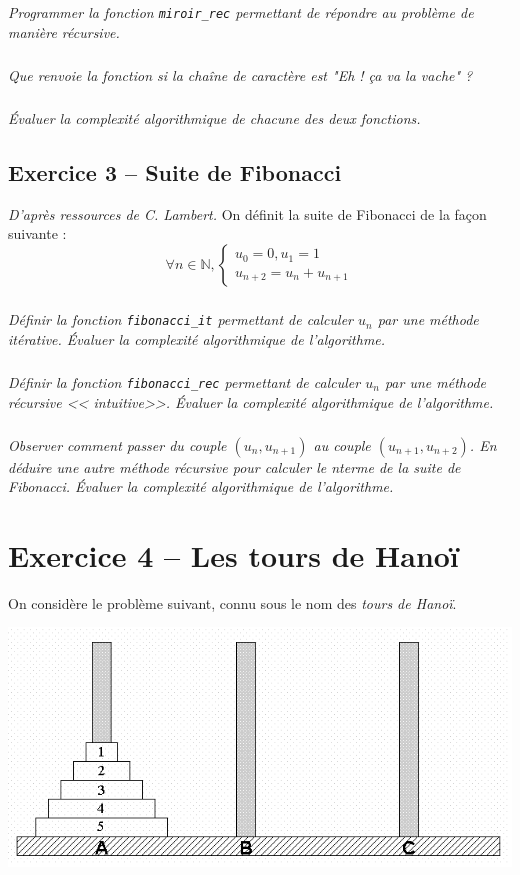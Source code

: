 \subparagraph{}
\textit{Programmer la fonction \texttt{miroir\_rec} permettant de répondre au problème de manière récursive.}


\subparagraph{}
\textit{Que renvoie la fonction si la chaîne de caractère est "Eh ! ça va la vache" ?}
 
 \subparagraph{}
\textit{Évaluer la complexité algorithmique de chacune des deux fonctions.}

 
\subsection*{Exercice 3 -- Suite de Fibonacci}
\setcounter{subparagraph}{0}

\ifprof
\else
\textit{D'après ressources de C. Lambert.}
On définit la suite de Fibonacci de la façon suivante : 
$$
\forall n\in \mathbb{N}, \left\{ \begin{array}{l}
u_0 = 0, u_1 = 1 \\
u_{n+2} = u_{n} + u_{n+1}
\end{array}\right.
$$
\fi
\subparagraph{}
\textit{Définir la fonction \texttt{fibonacci\_it} permettant de calculer $u_n$ par une méthode itérative. Évaluer la 
complexité algorithmique de l'algorithme.}

\subparagraph{}
\textit{Définir la fonction \texttt{fibonacci\_rec} permettant de calculer $u_n$ par une méthode récursive << 
intuitive>>. Évaluer la complexité algorithmique de l'algorithme.}


\subparagraph{}
\textit{Observer comment passer du couple $(u_n,u_{n+1})$ au couple $(u_{n+1},u_{n+2})$. En déduire une autre méthode 
récursive pour calculer le n\ieme terme de la suite de Fibonacci. Évaluer la complexité algorithmique de l'algorithme.}


\section*{Exercice 4 -- Les tours de Hanoï}

\setcounter{subparagraph}{0}

\ifprof
\else
On considère le problème suivant, connu sous le nom des \emph{tours de Hanoï}.

\begin{center}
\includegraphics[scale=0.3]{images/hanoi.png}
\end{center}

